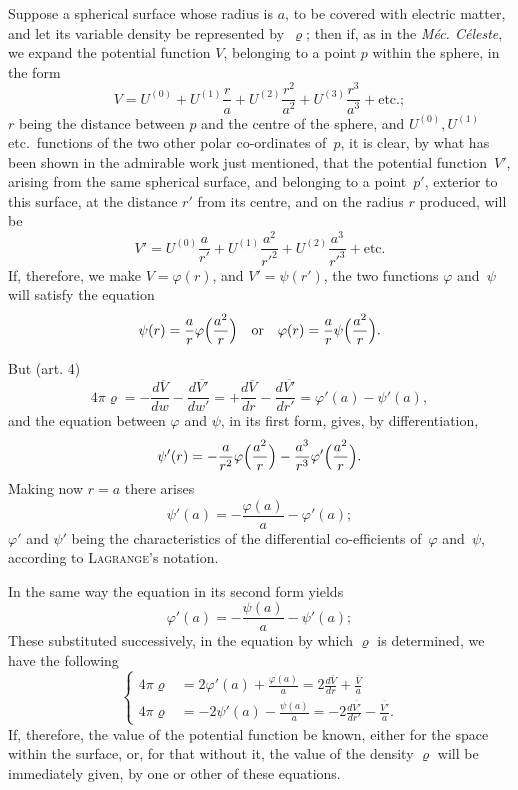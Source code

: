 \documentclass[12pt,notitlepage]{amsart}
\let\Person\textsc
\let\Title\textit
\renewcommand{\rho}{\varrho}
\renewcommand{\phi}{\varphi}
\begin{document}
Suppose a spherical surface whose radius is $a$, to be covered with
electric matter, and let its variable density be represented by~$\rho$;
then if, as
in the \Title{M\'ec. C\'eleste},
we expand the potential function $V$, belonging to a
point $p$ within the sphere, in the form
\[
V=U^{(0)}+U^{(1)}\frac{r}{a}
+U^{(2)}\frac{r^2}{a^2}
+U^{(3)}\frac{r^3}{a^3}
+\text{etc.};
\]
$r$ being the distance between $p$ and the centre of the sphere,
and $U^{(0)},U^{(1)}$
etc.\ functions of the two other polar co-ordinates of~$p$, it is clear, by
what has been shown in the admirable work just mentioned, that the potential
function~$V'$, arising from the same spherical surface, and belonging to a
point~$p'$, exterior to this surface,
at the distance $r'$ from its centre, and on
the radius $r$ produced, will be
\[
V'=U^{(0)}\frac{a}{r'}
+U^{(1)}\frac{a^2}{r'^2}
+U^{(2)}\frac{a^3}{r'^3}
+\text{etc.}
\]
If, therefore, we make $V=\phi(r)$, and $V'=\psi(r')$,
the two functions $\phi$ and~$\psi$
will satisfy the equation
\[
\psi(r)=\frac{a}{r}\phi\Bigl(\frac{a^2}{r}\Bigr)
\quad\text{or}\quad
\phi(r)=\frac{a}{r}\psi\Bigl(\frac{a^2}{r}\Bigr).
\]

But (art. 4)
\[
4\pi\varrho=
-\frac{d\overline{V}}{dw}-\frac{d\overline{V'}}{dw'}
=+\frac{d\overline{V}}{dr}-\frac{d\overline{V'}}{dr'}
=\phi'(a)-\psi'(a),
\]
and the equation between $\phi$ and $\psi$,
in its first form, gives, by differentiation,
\[
\psi'(r)=
-\frac{a}{r^2}\phi\Bigl(\frac{a^2}{r}\Bigr)
-\frac{a^3}{r^3}\phi'\Bigl(\frac{a^2}{r}\Bigr).
\]
Making now $r=a$ there arises
\[
\psi'(a)=-\frac{\phi(a)}{a}-\phi'(a);
\]
$\phi'$ and $\psi'$ being the characteristics of
the differential co-efficients of~$\phi$ and~$\psi$,
according to \Person{Lagrange}'s notation.

In the same way the equation in its second form yields
\[
\phi'(a)=-\frac{\psi(a)}{a}-\psi'(a);
\]
These substituted successively, in the equation
by which $\rho$ is determined, we
have the following
\[
\tag{9.}
\left\{\begin{aligned}
4\pi\rho&=2\phi'(a)+\frac{\phi(a)}{a}
=2\frac{d\overline{V}}{dr}+\frac{\overline{V}}{a}\\
4\pi\rho&=-2\psi'(a)-\frac{\psi(a)}{a}
=-2\frac{d\overline{V'}}{dr'}-\frac{\overline{V'}}{a}.
\end{aligned}\right.
\]
If, therefore, the value of the potential function be known, either for the
space within the surface, or, for that without it,
the value of the density $\rho$
will be immediately given, by one or other of these equations.
\end{document}
